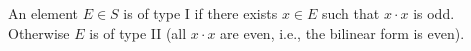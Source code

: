 An element $E \in S$ is of type I if there exists $x \in E$ such that $x \cdot x$ is odd. Otherwise $E$ is of type II (all $x \cdot x$ are even, i.e., the bilinear form is even).
